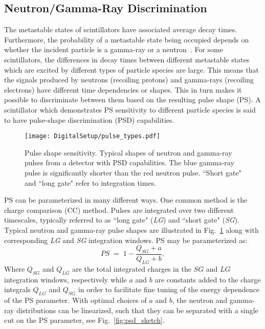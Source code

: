 \documentclass[main.tex]{subfiles}
\begin{document}
\subsection{Neutron/Gamma-Ray Discrimination}\label{sec:psd}
The metastable states of scintillators have associated average decay times. 
Furthermore, the probability of a metastable state being occupied depends on whether the incident particle is a gamma-ray or a neutron~\cite{Krane}. For some scintillators, the differences in decay times between different metastable states which are excited by different types of particle species are large. This means that the signals produced by neutrons (recoiling protons) and gamma-rays (recoiling electrons) have different time dependencies or shapes. This in turn makes it possible to discriminate between them based on the resulting pulse shape (PS). A scintillator which demonstrates PS sensitivity to different particle species is said to have pulse-shape discrimination (PSD) capabilities.
\begin{figure}[ht]
	\centering
    	\texttt{[image: DigitalSetup/pulse\_types.pdf]}
        \caption[Pulse shape sensitivity.]{Pulse shape sensitivity. Typical shapes of neutron and gamma-ray pulses from a detector with PSD capabilities. The blue gamma-ray pulse is significantly shorter than the red neutron pulse. ``Short gate" and ``long gate" refer to integration times.}
	    \label{fig:pulse_types} 
\end{figure}

PS can be parameterized in many different ways. One common method is the charge comparison (CC) method. Pulses are integrated over two different timescales, typically referred to as ``long gate" (\textit{LG}) and ``short gate" (\textit{SG}). Typical neutron and gamma-ray pulse shapes are illustrated in Fig.~\ref{fig:pulse_types} along with corresponding \textit{LG} and \textit{SG} integration windows. PS may be parameterized as:
\begin{equation}
	PS \; = \; 1-\frac{Q_{SG} + a}{Q_{LG} + b},
	\label{eq:ps}
\end{equation}
Where $Q_{SG}$ and $Q_{LG}$ are the total integrated charges in the $SG$ and $LG$ integration windows, respectively while $a$ and $b$ are constants added to the charge integrals $Q_{LG}$ and $Q_{SG}$ in order to facilitate fine tuning of the energy dependence of the PS parameter. 
With optimal choices of $a$ and $b$, the neutron and gamma-ray distributions can be linearized, such that they can be separated with a single cut on the PS parameter, see Fig.~\ref{fig:psd_sketch}.
\end{document}
